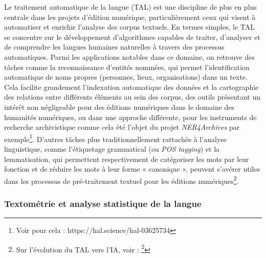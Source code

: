 Le traitement automatique de la langue (TAL) est une discipline de plus en plus centrale dans les projets d'édition numérique, particulièrement ceux qui visent à automatiser et enrichir l'analyse des corpus textuels. En termes simples, le TAL se concentre sur le développement d'algorithmes capables de traiter, d'analyser et de comprendre les langues humaines naturelles à travers des processus automatiques. Parmi les applications notables dans ce domaine, on retrouve des tâches comme la reconnaissance d'entités nommées, qui permet l'identification automatique de noms propres (personnes, lieux, organisations) dans un texte. Cela facilite grandement l'indexation automatique des données et la cartographie des relations entre différents éléments au sein des corpus, des outils présentant un intérêt non négligeable pour des éditions numériques dans le domaine des humanités numériques, ou dans une approche différente, pour les instruments de recherche archivistique comme cela été l’objet du projet \textit{NER4Archives} par exemple\footnote{Voir pour cela : https://hal.science/hal-03625734}. D'autres tâches plus traditionnellement rattachée à l’analyse linguistique, comme l'étiquetage grammatical (ou \textit{POS tagging}) et la lemmatisation, qui permettent respectivement de catégoriser les mots par leur fonction et de réduire les mots à leur forme « canonique », peuvent s’avérer utiles dans les processus de pré-traitement textuel pour les éditions numériques\footnote{Sur l’évolution du TAL vers l’IA, voir : \footcite[paragraphe 17]{leon_histoire_2015}}.

\subsubsection{Textométrie et analyse statistique de la langue}

\newline

